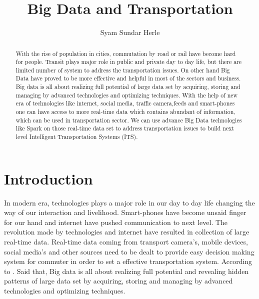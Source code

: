 \documentclass[sigconf]{acmart}
\begin{document}
\title{Big Data and Transportation}

\author{Syam Sundar Herle}

\begin{abstract}

With the rise of population in cities, commutation by road or rail have become hard for people. Transit plays major role in public and private day to day life, but there are limited number of system to address the transportation issues. On other hand Big Data have proved to be more effective and helpful in most of the sectors and business. Big data is all about realizing full potential of large data set by acquiring, storing and managing by advanced technologies and optimizing techniques. With the help of new era of technologies like internet, social media, traffic camera,feeds and smart-phones one can have access to more real-time data which contains abundant of information, which can be used in transportation sector. We can use advance Big Data technologies like Spark on those real-time data set to address transportation issues to build next level Intelligent Transportation Systems (ITS). 

\end{abstract}


\maketitle

\section{Introduction}

In modern era, technologies plays a major role in our day to day life changing the way of our interaction and livelihood. Smart-phones have become unsaid finger for our hand and internet have pushed communication to next level. The revolution made by technologies and internet have resulted in collection of large real-time data. Real-time data coming from transport camera's, mobile devices, social media's and other sources need to be dealt to provide easy decision making system for commuter in order to set a effective transportation system. According to \cite{bdtrans} . Said that, Big data is all about realizing full potential and revealing hidden patterns of large data set by acquiring, storing and managing by advanced technologies and optimizing techniques. 
\end{document}
